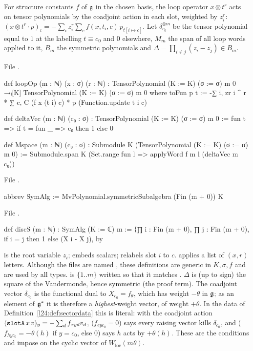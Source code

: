 \begin{definition}\label{l24:def:Mm}
For structure constants $f$ of $\mathfrak g$ in the chosen basis, the loop operator $x\otimes t^r$ acts on tensor
polynomials by the coadjoint action in each slot, weighted by $z_i^r$:
$(x\otimes t^r\cdot p)_t=-\sum_iz_i^r\sum_cf(x,t_i,c)\,p_{t[i\mapsto c]}$. Let $\delta_{c_0}^{\otimes m}$ be the
tensor polynomial equal to $1$ at the labelling $t\equiv c_0$ and $0$ elsewhere, $M_m$ the span of all loop words
applied to it, $B_m$ the symmetric polynomials and $\Delta=\prod_{i\neq j}(z_i-z_j)\in B_m$.
\end{definition}
\noindent File .
\begin{leancode}
def loopOp (m : ℕ) (x : σ) (r : ℕ) :
    TensorPolynomial (K := K) (σ := σ) m 0 →ₗ[K] TensorPolynomial (K := K) (σ := σ) m 0 where
  toFun p t := -∑ i, zr i ^ r * ∑ c, C (f x (t i) c) * p (Function.update t i c)

def deltaVec (m : ℕ) (c₀ : σ) : TensorPolynomial (K := K) (σ := σ) m 0 :=
  fun t => if t = fun _ => c₀ then 1 else 0

def Mspace (m : ℕ) (c₀ : σ) : Submodule K (TensorPolynomial (K := K) (σ := σ) m 0) :=
  Submodule.span K (Set.range fun l => applyWord f m l (deltaVec m c₀))
\end{leancode}
\noindent File .
\begin{leancode}
abbrev SymAlg := MvPolynomial.symmetricSubalgebra (Fin (m + 0)) K
\end{leancode}
\noindent File .
\begin{leancode}
def discS (m : ℕ) : SymAlg (K := ℂ) m :=
  ⟨∏ i : Fin (m + 0), ∏ j : Fin (m + 0), if i = j then 1 else (X i - X j), by
\end{leancode}

\begin{dictionary}
 is the root variable $z_i$;  embeds scalars;  relabels slot $i$
to $c$.  applies a list of $(x,r)$ letters. Although the files are named ,
these definitions are generic in $K,\sigma,f$ and are used by all types.  is $\{1..m\}$ written so
that it matches . $\Delta$ is (up to sign) the square of the Vandermonde, hence symmetric (the
proof term). The coadjoint vector $\delta_{c_0}$ is the functional dual to $X_{c_0}=f_\theta$, which has weight
$-\theta$ in $\mathfrak g$; as an element of $\mathfrak g^*$ it is therefore a \emph{highest}-weight vector, of weight
$+\theta$. In the data of Definition~\ref{l24:def:sectordata} this is literal: with the coadjoint action
$(\lean{slotA}\,x\,v)_y=-\sum_df_{xyd}v_d$,  ($f_{e y c_0}=0$) says every raising vector kills
$\delta_{c_0}$, and  ($f_{h y c_0}=-\theta(h)$ if $y=c_0$, else $0$) says $h$ acts by $+\theta(h)$. These
are the conditions  and  impose on the cyclic vector of
$W_{\mathrm{loc}}(m\theta)$.
\end{dictionary}

